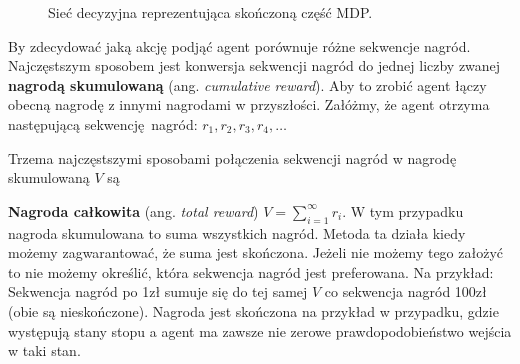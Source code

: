 \documentclass[a4paper, 12pt,oneside]{book}
\begin{document}
\begin{figure}[!htb]
\begin{center}
\caption{Sieć decyzyjna reprezentująca skończoną część MDP.}
\label{markov_decision_process}
\end{center}
\end{figure}

By zdecydować jaką akcję podjąć agent porównuje różne sekwencje nagród.
Najczęstszym sposobem jest konwersja sekwencji nagród do jednej liczby zwanej
\textbf{nagrodą skumulowaną} (ang. \textit{cumulative reward}). Aby to zrobić
agent łączy obecną nagrodę z innymi nagrodami w przyszłości. Załóżmy, że agent
otrzyma następującą sekwencję nagród: $r_1, r_2, r_3, r_4, \dots$

Trzema najczęstszymi sposobami połączenia sekwencji nagród w nagrodę
skumulowaną $V$ są

\textbf{Nagroda całkowita} (ang. \textit{total reward}) $V =
\sum_{i=1}^{\infty} r_i$. W tym przypadku nagroda skumulowana to suma
wszystkich nagród. Metoda ta działa kiedy możemy zagwarantować, że suma jest
skończona. Jeżeli nie możemy tego założyć to nie możemy określić, która
sekwencja nagród jest preferowana. Na przykład: Sekwencja nagród po 1zł sumuje
się do tej samej $V$ co sekwencja nagród 100zł (obie są nieskończone). Nagroda
jest skończona na przykład w przypadku, gdzie występują stany stopu a agent ma
zawsze nie zerowe prawdopodobieństwo wejścia w taki stan.
\end{document}
